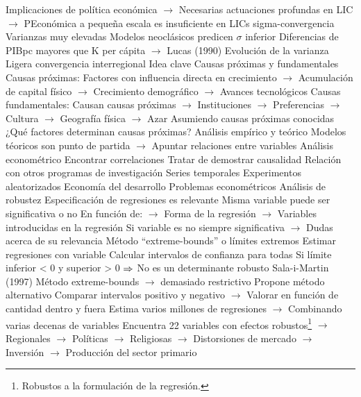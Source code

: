 \documentclass{nuevotema}
\begin{document}
\begin{esquemal}
				\4[] Implicaciones de política económica
				\4[] $\to$ Necesarias actuaciones profundas en LIC
				\4[] $\to$ PEconómica a pequeña escala es insuficiente en LICs
			\3 sigma-convergencia
				\4 Varianzas muy elevadas
				\4[] Modelos neoclásicos predicen $\sigma$ inferior
				\4[] Diferencias de PIBpc mayores que K per cápita
				\4[] $\to$ Lucas (1990)
				\4 Evolución de la varianza
				\4[] Ligera convergencia interregional
	\1 
		\2 Idea clave
			\3 Causas próximas y fundamentales
				\4 Causas próximas:
				\4[] Factores con influencia directa en crecimiento
				\4[] $\to$ Acumulación de capital físico
				\4[] $\to$ Crecimiento demográfico
				\4[] $\to$ Avances tecnológicos
				\4 Causas fundamentales:
				\4[] Causan causas próximas
				\4[] $\to$ Instituciones
				\4[] $\to$ Preferencias
				\4[] $\to$ Cultura
				\4[] $\to$ Geografía física
				\4[] $\to$ Azar
				\4 Asumiendo causas próximas conocidas
				\4[] ¿Qué factores determinan causas próximas?
			\3 Análisis empírico y teórico
				\4 Modelos téoricos son punto de partida
				\4[] $\to$ Apuntar relaciones entre variables
				\4 Análisis econométrico
				\4[] Encontrar correlaciones
				\4[] Tratar de demostrar causalidad
			\3 Relación con otros programas de investigación
				\4 Series temporales
				\4 Experimentos aleatorizados
				\4 Economía del desarrollo
		\2 Problemas econométricos
			\3 Análisis de robustez
				\4 Especificación de regresiones es relevante
				\4 Misma variable puede ser significativa o no
				\4[] En función de:
				\4[] $\to$ Forma de la regresión
				\4[] $\to$ Variables introducidas en la regresión
				\4 Si variable es no siempre significativa
				\4[] $\to$ Dudas acerca de su relevancia
				\4 Método ``extreme-bounds'' o límites extremos
				\4[] Estimar regresiones con variable
				\4[] Calcular intervalos de confianza para todas
				\4[] Si límite inferior < 0  y superior > 0
				\4[] $\Rightarrow$ No es un determinante robusto
				\4 Sala-i-Martin (1997)
				\4[] Método extreme-bounds
				\4[] $\to$ demasiado restrictivo
				\4[] Propone método alternativo
				\4[] Comparar intervalos positivo y negativo
				\4[] $\to$ Valorar en función de cantidad dentro y fuera
				\4[] Estima varios millones de regresiones
				\4[] $\to$ Combinando varias decenas de variables
				\4[] Encuentra 22 variables con efectos robustos\footnote{Robustos a la formulación de la regresión.}
				\4[] $\to$ Regionales
				\4[] $\to$ Políticas
				\4[] $\to$ Religiosas
				\4[] $\to$ Distorsiones de mercado
				\4[] $\to$ Inversión
				\4[] $\to$ Producción del sector primario

\end{esquemal}
\end{document}
